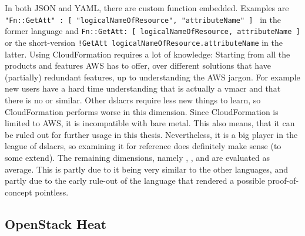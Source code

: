 \newline
In both JSON and YAML, there are custom function embedded. Examples are
\newline %
\texttt{{ "Fn::GetAtt" : [ "logicalNameOfResource", "attributeName" ] }} in the former language and \texttt{Fn::GetAtt: [ logicalNameOfResource, attributeName ]} or the short-version
\newline %
\texttt{!GetAtt logicalNameOfResource.attributeName} in the latter.
\newline
Using CloudFormation requires a lot of knowledge: Starting from all the products and features AWS has to offer, over different solutions that have (partially) redundant features, up to understanding the AWS jargon. For example new users have a hard time understanding that  is actually a \gls{vmacr} and that there is no  or similar. Other \gls{dslacr}s require less new things to learn, so CloudFormation performs worse in this dimension.
\newline
Since CloudFormation is limited to AWS, it is incompatible with bare metal. This also means, that it can be ruled out for further usage in this thesis. Nevertheless, it is a big player in the league of \gls{dslacr}s, so examining it for reference does definitely make sense (to some extend).
\newline
The remaining dimensions, namely , ,  and  are evaluated as average. This is partly due to it being very similar to the other languages, and partly due to the early rule-out of the language that rendered a possible proof-of-concept pointless.

\subsection{OpenStack Heat}

